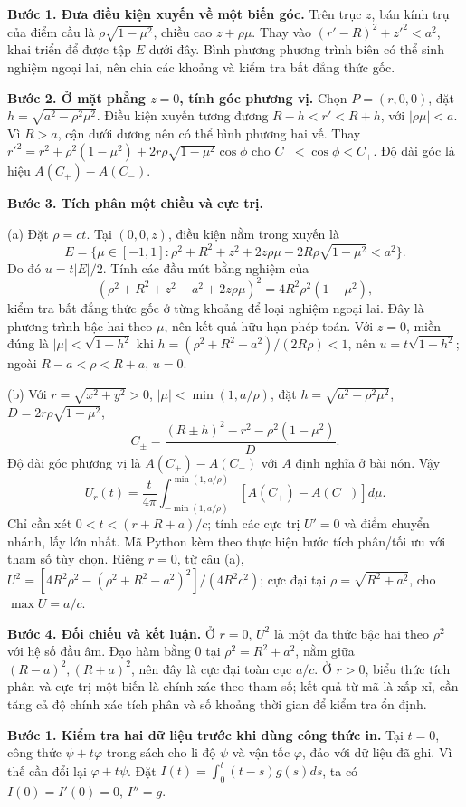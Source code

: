 \textbf{Bước 1. Đưa điều kiện xuyến về một biến góc.} Trên trục $z$, bán kính trụ của điểm cầu là $\rho\sqrt{1-\mu^2}$, chiều cao $z+\rho\mu$. Thay vào $(r'-R)^2+z'^2<a^2$, khai triển để được tập $E$ dưới đây. Bình phương phương trình biên có thể sinh nghiệm ngoại lai, nên chia các khoảng và kiểm tra bất đẳng thức gốc.

\textbf{Bước 2. Ở mặt phẳng $z=0$, tính góc phương vị.} Chọn $P=(r,0,0)$, đặt $h=\sqrt{a^2-\rho^2\mu^2}$. Điều kiện xuyến tương đương $R-h<r'<R+h$, với $|\rho\mu|<a$. Vì $R>a$, cận dưới dương nên có thể bình phương hai vế. Thay $r'^2=r^2+\rho^2(1-\mu^2)+2r\rho\sqrt{1-\mu^2}\cos\phi$ cho $C_-<\cos\phi<C_+$. Độ dài góc là hiệu $A(C_+)-A(C_-)$.

\textbf{Bước 3. Tích phân một chiều và cực trị.}

(a) Đặt $\rho=ct$. Tại $(0,0,z)$, điều kiện nằm trong xuyến là
\[E=\{\mu\in[-1,1]:\rho^2+R^2+z^2+2z\rho\mu-2R\rho\sqrt{1-\mu^2}<a^2\}.\]
Do đó $u=t|E|/2$. Tính các đầu mút bằng nghiệm của
\[(\rho^2+R^2+z^2-a^2+2z\rho\mu)^2=4R^2\rho^2(1-\mu^2),\]
kiểm tra bất đẳng thức gốc ở từng khoảng để loại nghiệm ngoại lai. Đây là phương trình bậc hai theo $\mu$, nên kết quả hữu hạn phép toán. Với $z=0$, miền đúng là $|\mu|<\sqrt{1-h^2}$ khi $h=(\rho^2+R^2-a^2)/(2R\rho)<1$, nên $u=t\sqrt{1-h^2}$; ngoài $R-a<\rho<R+a$, $u=0$.

(b) Với $r=\sqrt{x^2+y^2}>0$, $|\mu|<\min(1,a/\rho)$, đặt $h=\sqrt{a^2-\rho^2\mu^2}$, $D=2r\rho\sqrt{1-\mu^2}$,
\[C_\pm=\frac{(R\pm h)^2-r^2-\rho^2(1-\mu^2)}D.\]
Độ dài góc phương vị là $A(C_+)-A(C_-)$ với $A$ định nghĩa ở bài nón. Vậy
\[U_r(t)=\frac t{4\pi}\int_{-\min(1,a/\rho)}^{\min(1,a/\rho)}[A(C_+)-A(C_-)]d\mu.\]
Chỉ cần xét $0<t<(r+R+a)/c$; tính các cực trị $U'=0$ và điểm chuyển nhánh, lấy lớn nhất. Mã Python kèm theo thực hiện bước tích phân/tối ưu với tham số tùy chọn. Riêng $r=0$, từ câu (a), $U^2=[4R^2\rho^2-(\rho^2+R^2-a^2)^2]/(4R^2c^2)$; cực đại tại $\rho=\sqrt{R^2+a^2}$, cho $\max U=a/c$.

\textbf{Bước 4. Đối chiếu và kết luận.} Ở $r=0$, $U^2$ là một đa thức bậc hai theo $\rho^2$ với hệ số đầu âm. Đạo hàm bằng $0$ tại $\rho^2=R^2+a^2$, nằm giữa $(R-a)^2,(R+a)^2$, nên đây là cực đại toàn cục $a/c$. Ở $r>0$, biểu thức tích phân và cực trị một biến là chính xác theo tham số; kết quả từ mã là xấp xỉ, cần tăng cả độ chính xác tích phân và số khoảng thời gian để kiểm tra ổn định.

\textbf{Bước 1. Kiểm tra hai dữ liệu trước khi dùng công thức in.} Tại $t=0$, công thức $\psi+t\varphi$ trong sách cho li độ $\psi$ và vận tốc $\varphi$, đảo với dữ liệu đã ghi. Vì thế cần đổi lại $\varphi+t\psi$. Đặt $I(t)=\int_0^t(t-s)g(s)ds$, ta có $I(0)=I'(0)=0$, $I''=g$.

